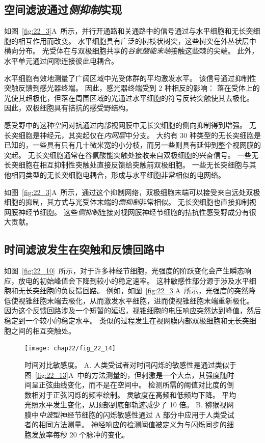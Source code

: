 \subsection{空间滤波通过\textit{侧抑制}实现}

如图~\ref{fig:22_3}A~所示，并行开通路和关通路中的信号通过与水平细胞和无长突细胞的相互作用而改变。
水平细胞具有广泛的树枝状树突，这些树突在外丛状层中横向分布。
光受体在与双极细胞共享的\textit{谷氨酸能末端}接触这些棘的尖端。
此外，水平单元通过间隙连接彼此电耦合。


水平细胞有效地测量了广阔区域中光受体群的平均激发水平。
该信号通过抑制性突触反馈到感光器终端。
因此，感光器终端受到 2 种相反的影响：
落在受体上的光使其超极化，但落在周围区域的光通过水平细胞的符号反转突触使其去极化。
因此，双极细胞具有拮抗的感受野结构。


感受野中的这种空间对抗通过内部视网膜中无长突细胞的侧向抑制得到增强。
无长突细胞是神经元，其突起仅在\textit{内网层}中分支。
大约有 30 种类型的无长突细胞是已知的，一些具有只有几十微米宽的小分枝，而另一些则具有延伸到整个视网膜的突起。
无长突细胞通常在谷氨酸能突触处接收来自双极细胞的兴奋信号。
一些无长突细胞在相互抑制性突触处直接反馈给突触前双极细胞。
一些无长突细胞与其他相同类型的无长突细胞电耦合，形成与水平细胞非常相似的电网络。


如图~\ref{fig:22_3}A~所示，通过这个抑制网络，双极细胞末端可以接受来自远处双极细胞的抑制，其方式与光受体末端的\textit{侧抑制}非常相似。
无长突细胞也直接抑制视网膜神经节细胞。
这些\textit{侧抑制}连接对视网膜神经节细胞的拮抗性感受野成分有很大贡献。



\subsection{时间滤波发生在突触和反馈回路中}

如图~\ref{fig:22_10}~所示，对于许多神经节细胞，光强度的阶跃变化会产生瞬态响应，放电的初始峰值会下降到较小的稳定速率。
这种敏感性部分源于涉及水平细胞和无长突细胞的负反馈回路。
例如，如图~\ref{fig:22_3}A~所示，光强度的突然降低使视锥细胞末端去极化，从而激发水平细胞，进而使视锥细胞末端重新极化。
因为这个反馈回路涉及一个短暂的延迟，视锥细胞的电压响应突然达到峰值，然后稳定到一个较小的稳定水平。
类似的过程发生在视网膜内部双极细胞和无长突细胞之间的相互突触处。


\begin{figure}[htbp]
	\centering
	\texttt{[image: chap22/fig\_22\_14]}
	\caption{时间对比敏感度。
		A. 人类受试者对时间闪烁的敏感性是通过类似于图~\ref{fig:22_13}A~中的方法测量的，但刺激是一个大点，其强度随时间呈正弦曲线变化，而不是在空间中。 
		检测所需的阈值对比度的倒数相对于正弦闪烁的频率绘制。
		灵敏度在高频和低频均下降。
		平均光照水平发生变化，从顶部到底部轨迹减少了 10 倍。
		B. 猕猴视网膜中\textit{中波}型神经节细胞的闪烁敏感性通过 A 部分中应用于人类受试者的相同方法测量。
		神经响应的检测阈值被定义为与闪烁同步的细胞发放率每秒 20 个脉冲的变化。}
	\label{fig:22_14}
\end{figure}


